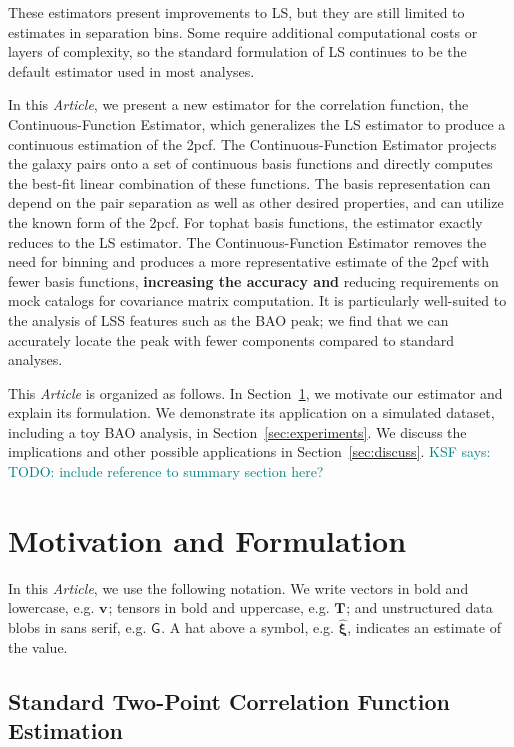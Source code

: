 \documentclass[modern]{aastex62}
\newcommand{\cf}{2pcf\xspace}
\newcommand{\Est}{The Continuous-Function Estimator\xspace}
\newcommand{\est}{the Continuous-Function Estimator\xspace}
\newcommand{\documentname}{\textsl{Article}\xspace}
\newcommand{\LS}{LS\xspace}
\newcommand{\bld}[1]{\bm{#1}}
\newcommand{\vv}[1]{\bld{v}_\mathrm{#1}}
\newcommand{\TT}[1]{\bld{T}_\mathrm{#1}}
\newcommand{\GG}[1]{\mathsf{G}_{#1}}
\newcommand{\KSF}[1]{\textcolor{teal}{KSF says: #1}}
\newcommand{\new}[1]{\textbf{#1}}
\begin{document}
These estimators present improvements to \LS, but they are still limited to estimates in separation bins.
Some require additional computational costs or layers of complexity, so the standard formulation of \LS continues to be the default estimator used in most analyses.

In this \documentname, we present a new estimator for the correlation function, \est, which generalizes the \LS estimator to produce a continuous estimation of the \cf. 
\Est projects the galaxy pairs onto a set of continuous basis functions and directly computes the best-fit linear combination of these functions.
The basis representation can depend on the pair separation as well as other desired properties, and can utilize the known form of the \cf.
For tophat basis functions, the estimator exactly reduces to the \LS estimator. 
\Est removes the need for binning and produces a more representative estimate of the \cf with fewer basis functions, \new{increasing the accuracy and} reducing requirements on mock catalogs for covariance matrix computation.
It is particularly well-suited to the analysis of LSS features such as the BAO peak; we find that we can accurately locate the peak with fewer components compared to standard analyses.

This \documentname is organized as follows. 
In Section~\ref{sec:motiv}, we motivate our estimator and explain its formulation.
We demonstrate its application on a simulated dataset, including a toy BAO analysis, in Section~\ref{sec:experiments}.
We discuss the implications and other possible applications in Section~\ref{sec:discuss}. 
\KSF{TODO: include reference to summary section here?}

\section{Motivation and Formulation} 
\label{sec:motiv}

In this \documentname, we use the following notation.
We write vectors in bold and lowercase, e.g. $\vv{}$; tensors in bold and uppercase, e.g. $\TT{}$; and unstructured data blobs in sans serif, e.g. $\GG{}$.
A hat above a symbol, e.g. $\bld{\hat{\xi}}$, indicates an estimate of the value.

\subsection{Standard Two-Point Correlation Function Estimation}
\end{document}
